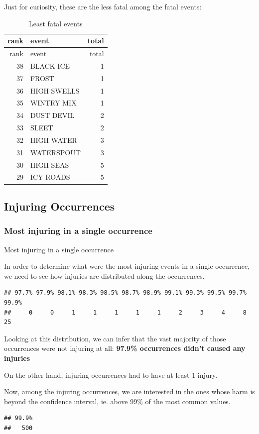 \documentclass[]{article}
\begin{document}
Just for curiosity, these are the less fatal among the fatal events:

\begin{longtable}[]{@{}rlr@{}}
\caption{Least fatal events}\tabularnewline
\toprule
rank & event & total\tabularnewline
\midrule
\endfirsthead
\toprule
rank & event & total\tabularnewline
\midrule
\endhead
38 & BLACK ICE & 1\tabularnewline
37 & FROST & 1\tabularnewline
36 & HIGH SWELLS & 1\tabularnewline
35 & WINTRY MIX & 1\tabularnewline
34 & DUST DEVIL & 2\tabularnewline
33 & SLEET & 2\tabularnewline
32 & HIGH WATER & 3\tabularnewline
31 & WATERSPOUT & 3\tabularnewline
30 & HIGH SEAS & 5\tabularnewline
29 & ICY ROADS & 5\tabularnewline
\bottomrule
\end{longtable}

\subsection{Injuring Occurrences}\label{injuring-occurrences}

\subsubsection{Most injuring in a single
occurrence}\label{most-injuring-in-a-single-occurrence}

Most injuring in a single occurrence

In order to determine what were the most injuring events in a single
occurrence, we need to see how injuries are distributed along the
occurrences.

\begin{verbatim}
## 97.7% 97.9% 98.1% 98.3% 98.5% 98.7% 98.9% 99.1% 99.3% 99.5% 99.7% 99.9% 
##     0     0     1     1     1     1     1     2     3     4     8    25
\end{verbatim}

Looking at this distribution, we can infer that the vast majority of
those occurrences were not injuring at all: \textbf{97.9\% occurrences
didn't caused any injuries}

On the other hand, injuring occurrences had to have at least 1 injury.

Now, among the injuring occurrences, we are interested in the ones whose
harm is beyond the confidence interval, ie. above 99\% of the most
common values.

\begin{verbatim}
## 99.9% 
##   500
\end{verbatim}
\end{document}
